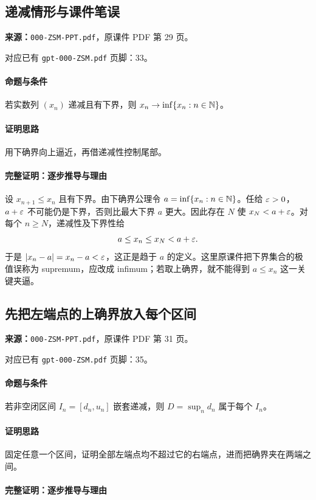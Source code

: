 \clearpage\subsection{递减情形与课件笔误}
\textbf{来源：}\texttt{000-ZSM-PPT.pdf}，原课件 PDF 第 29 页。\par
对应已有 \texttt{gpt-000-ZSM.pdf} 页脚：33。\par
\paragraph{命题与条件}若实数列 $(x_n)$ 递减且有下界，则 $x_n\to\inf\{x_n:n\in\mathbb{N}\}$。
\paragraph{证明思路}用下确界向上逼近，再借递减性控制尾部。
\paragraph{完整证明：逐步推导与理由}

设 $x_{n+1}\le x_n$ 且有下界。由下确界公理令 $a=\inf\{x_n:n\in\mathbb{N}\}$。任给 $\varepsilon>0$，$a+\varepsilon$ 不可能仍是下界，否则比最大下界 $a$ 更大。因此存在 $N$ 使 $x_N<a+\varepsilon$。对每个 $n\ge N$，递减性及下界性给
\[a\le x_n\le x_N<a+\varepsilon.\]
于是 $|x_n-a|=x_n-a<\varepsilon$，这正是趋于 $a$ 的定义。这里原课件把下界集合的极值误称为 supremum，应改成 infimum；若取上确界，就不能得到 $a\le x_n$ 这一关键夹逼。

\clearpage\subsection{先把左端点的上确界放入每个区间}
\textbf{来源：}\texttt{000-ZSM-PPT.pdf}，原课件 PDF 第 31 页。\par
对应已有 \texttt{gpt-000-ZSM.pdf} 页脚：35。\par
\paragraph{命题与条件}若非空闭区间 $I_n=[d_n,u_n]$ 嵌套递减，则 $D=\sup_n d_n$ 属于每个 $I_n$。
\paragraph{证明思路}固定任意一个区间，证明全部左端点均不超过它的右端点，进而把确界夹在两端之间。
\paragraph{完整证明：逐步推导与理由}

